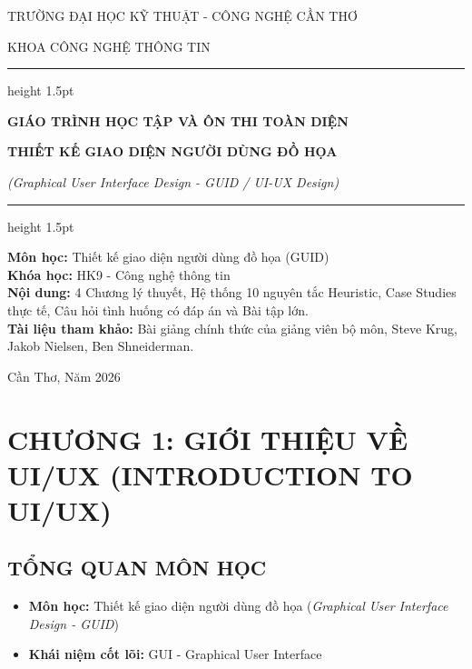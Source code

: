 \documentclass[11pt,a4paper,oneside]{report}
\begin{document}
\begin{titlepage}
    \centering
    \vspace*{1.5cm}
    {\scshape\LARGE TRƯỜNG ĐẠI HỌC KỸ THUẬT - CÔNG NGHỆ CẦN THƠ \par}
    {\scshape\large KHOA CÔNG NGHỆ THÔNG TIN \par}
    \vspace{1.5cm}
    \hrule height 1.5pt
    \vspace{0.6cm}
    {\huge\bfseries GIÁO TRÌNH HỌC TẬP VÀ ÔN THI TOÀN DIỆN\par}
    \vspace{0.4cm}
    {\LARGE\bfseries THIẾT KẾ GIAO DIỆN NGƯỜI DÙNG ĐỒ HỌA\par}
    {\Large\textit{(Graphical User Interface Design - GUID / UI-UX Design)}\par}
    \vspace{0.6cm}
    \hrule height 1.5pt
    \vspace{2cm}
    
    \begin{minipage}{0.85\textwidth}
        \large
        \textbf{Môn học:} Thiết kế giao diện người dùng đồ họa (GUID)\\
        \textbf{Khóa học:} HK9 - Công nghệ thông tin\\
        \textbf{Nội dung:} 4 Chương lý thuyết, Hệ thống 10 nguyên tắc Heuristic, Case Studies thực tế, Câu hỏi tình huống có đáp án và Bài tập lớn.\\
        \textbf{Tài liệu tham khảo:} Bài giảng chính thức của giảng viên bộ môn, Steve Krug, Jakob Nielsen, Ben Shneiderman.
    \end{minipage}
    
    \vfill
    {\large Cần Thơ, Năm 2026 \par}
\end{titlepage}

\tableofcontents
\newpage

\chapter{CHƯƠNG 1: GIỚI THIỆU VỀ UI/UX (INTRODUCTION TO UI/UX)}

\section{TỔNG QUAN MÔN HỌC}
\begin{itemize}[leftmargin=1.5em]
\item \textbf{Môn học:} Thiết kế giao diện người dùng đồ họa (\textit{Graphical User Interface Design - GUID})  
\item \textbf{Khái niệm cốt lõi:} GUI - Graphical User Interface  
\end{itemize}
\end{document}
